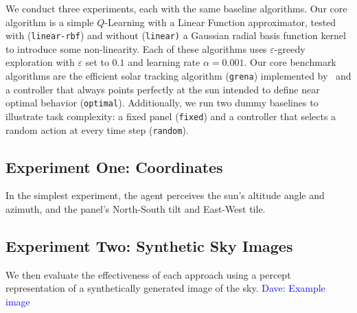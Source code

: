 \documentclass[11pt]{article}
\newcommand{\dnote}[1]{\textcolor{blue}{Dave: #1}}
\newcommand{\mc}{\mathcal}
\begin{document}
We conduct three experiments, each with the same baseline algorithms. Our core algorithm is a simple $Q$-Learning with a Linear Function approximator, tested with (\texttt{linear-rbf}) and without (\texttt{linear)} a Gaussian radial basis function kernel to introduce some non-linearity. Each of these algorithms uses $\varepsilon$-greedy exploration with $\varepsilon$ set to $0.1$ and learning rate $\alpha = 0.001$. Our core benchmark algorithms are the efficient solar tracking algorithm (\texttt{grena}) implemented by~\citet{Grena2008} and a controller that always points perfectly at the sun intended to define near optimal behavior (\texttt{optimal}). Additionally, we run two dummy baselines to illustrate task complexity: a fixed panel (\texttt{fixed}) and a controller that selects a random action at every time step (\texttt{random}).



\subsection{Experiment One: Coordinates}

In the simplest experiment, the agent perceives the sun's altitude angle and azimuth, and the panel's North-South tilt and East-West tile.

\subsection{Experiment Two: Synthetic Sky Images}

We then evaluate the effectiveness of each approach using a percept representation of a synthetically generated image of the sky.
\dnote{Example image}
\end{document}

